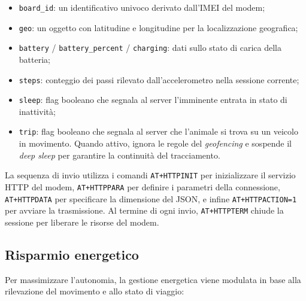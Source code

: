 \documentclass[12pt,a4paper]{article}
\begin{document}
\begin{itemize}
    \item \texttt{board\_id}: un identificativo univoco derivato dall'IMEI del modem;
    \item \texttt{geo}: un oggetto con latitudine e longitudine per la localizzazione geografica;
    \item \texttt{battery} / \texttt{battery\_percent} / \texttt{charging}:
          dati sullo stato di carica della batteria;
    \item \texttt{steps}: conteggio dei passi rilevato dall'accelerometro nella sessione corrente;
    \item \texttt{sleep}: flag booleano che segnala al server l'imminente entrata in stato
          di inattività;
    \item \texttt{trip}: flag booleano che segnala al server che l'animale si trova su un
          veicolo in movimento. Quando attivo, ignora le regole del \textit{geofencing}
          e sospende il \textit{deep sleep} per garantire la continuità del tracciamento.
\end{itemize}

La sequenza di invio utilizza i comandi 
\texttt{AT+HTTPINIT} per inizializzare il servizio HTTP del modem, 
\texttt{AT+HTTPPARA} per definire i parametri della connessione,
\texttt{AT+HTTPDATA} per specificare la dimensione del JSON,
e infine \texttt{AT+HTTPACTION=1} per avviare la trasmissione. 
Al termine di ogni invio, \texttt{AT+HTTPTERM} 
chiude la sessione per liberare le risorse del modem.

\subsection{Risparmio energetico}

Per massimizzare l'autonomia, la gestione energetica 
viene modulata in base alla rilevazione del movimento e allo stato di viaggio:
\end{document}
